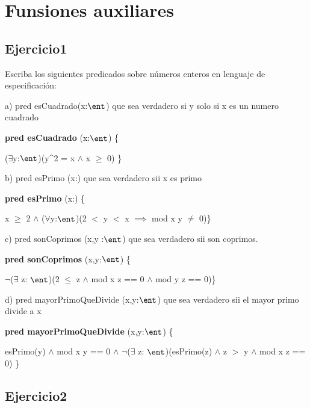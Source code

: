 \documentclass[10pt,a4paper]{article}
\begin{document}
\maketitle
\section{Funsiones auxiliares}
\subsection{Ejercicio1}

Escriba los siguientes predicados sobre números enteros en lenguaje de especificación:

\vspace{0.3cm}

a) pred esCuadrado(x:$\ent$) que sea verdadero si y solo si x es un numero cuadrado 

\textbf{pred esCuadrado} (x:$\ent$) \{

($\exists$y:$\ent$)(y^2 = x $\wedge$ x $\geq$ 0) \}


\vspace{0.3cm}

b) pred esPrimo (x:\ent) que sea verdadero sii x es primo 

\textbf{pred esPrimo} (x:\ent) \{

 x $\geq$ 2 $\wedge$ ($\forall$y:$\ent$)(2 $<$ y $<$ x $\implies$ mod x y $\neq$ 0)\}

 \vspace{0.3cm}

 c) pred sonCoprimos (x,y :$\ent$) que sea verdadero sii son coprimos.

 \textbf{pred sonCoprimos} (x,y:$\ent$) \{

$\neg$($\exists$ z: $\ent$)(2 $\leq$ z $\wedge$ mod x z == 0 $\wedge$ mod y z == 0)\}

\vspace{0.3cm}

d) pred mayorPrimoQueDivide (x,y:$\ent$) que sea verdadero sii el mayor primo divide a x 

\textbf{pred mayorPrimoQueDivide} (x,y:$\ent$) \{ 

esPrimo(y) $\wedge$ mod x y == 0 $\wedge$ $\neg$($\exists$ z: $\ent$)(esPrimo(z) $\wedge$ z $>$ y $\wedge$ mod x z == 0)   \} 

\subsection{Ejercicio2}
\end{document}
